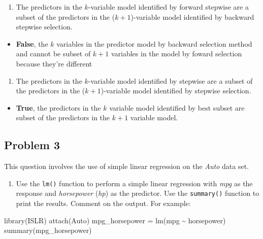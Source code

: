 \documentclass[
]{article}
\newenvironment{Shaded}{\begin{snugshade}}{\end{snugshade}}
\newcommand{\FunctionTok}[1]{\textcolor[rgb]{0.00,0.00,0.00}{#1}}
\newcommand{\NormalTok}[1]{#1}
\newcommand{\OtherTok}[1]{\textcolor[rgb]{0.56,0.35,0.01}{#1}}
\newcommand{\SpecialCharTok}[1]{\textcolor[rgb]{0.00,0.00,0.00}{#1}}
\providecommand{\tightlist}{%
  \setlength{\itemsep}{0pt}\setlength{\parskip}{0pt}}
\begin{document}
\begin{enumerate}
\def\labelenumi{(\alph{enumi})}
\setcounter{enumi}{3}
\tightlist
\item
  The predictors in the \(k\)-variable model identified by forward
  stepwise are a subset of the predictors in the (\(k+1\))-variable
  model identified by backward stepwise selection.
\end{enumerate}

\begin{itemize}
\tightlist
\item
  \textbf{False}, the \(k\) variables in the predictor model by backward
  selection method and cannot be subset of \(k+1\) variables in the
  model by foward selection because they're different
\end{itemize}

\begin{enumerate}
\def\labelenumi{(\alph{enumi})}
\setcounter{enumi}{4}
\tightlist
\item
  The predictors in the \(k\)-variable model identified by stepwise are
  a subset of the predictors in the (\(k + 1\))-variable model
  identified by stepwise selection.
\end{enumerate}

\begin{itemize}
\tightlist
\item
  \textbf{True}, the predictors in the \(k\) variable model identified
  by best subset are subset of the predictors in the \(k+1\) variable
  model.
\end{itemize}

\newpage

\hypertarget{problem-3}{%
\subsection{Problem 3}\label{problem-3}}

This question involves the use of simple linear regression on the
\emph{Auto} data set.

\begin{enumerate}
\def\labelenumi{(\alph{enumi})}
\tightlist
\item
  Use the \texttt{lm()} function to perform a simple linear regression
  with \emph{mpg} as the response and \emph{horsepower} (\emph{hp}) as
  the predictor. Use the \texttt{summary()} function to print the
  results. Comment on the output. For example:
\end{enumerate}

\begin{Shaded}
\begin{Highlighting}[]
\FunctionTok{library}\NormalTok{(ISLR)}
\FunctionTok{attach}\NormalTok{(Auto)}
\NormalTok{mpg\_horsepower }\OtherTok{=} \FunctionTok{lm}\NormalTok{(mpg }\SpecialCharTok{\textasciitilde{}}\NormalTok{ horsepower)}
\FunctionTok{summary}\NormalTok{(mpg\_horsepower)}
\end{Highlighting}
\end{Shaded}
\end{document}
